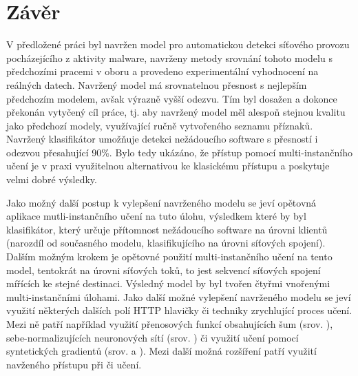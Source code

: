 \chapter*{Závěr}

V předložené práci byl navržen model pro automatickou detekci síťového provozu pocházejícího z aktivity malware, navrženy metody srovnání tohoto modelu s předchozími pracemi v oboru a provedeno experimentální vyhodnocení na reálných datech. Navržený model má srovnatelnou přesnost s nejlepším předchozím modelem, avšak výrazně vyšší odezvu. Tím byl dosažen a dokonce překonán vytyčený cíl práce, tj. aby navržený model měl alespoň stejnou kvalitu jako předchozí modely, využívající ručně vytvořeného seznamu příznaků. Navržený klasifikátor umožňuje detekci nežádoucího software s přesností i odezvou přesahující 90\%. Bylo tedy ukázáno, že přístup pomocí multi-instančního učení je v praxi využitelnou alternativou ke klasickému přístupu a poskytuje velmi dobré výsledky.

Jako možný další postup k vylepšení navrženého modelu se jeví opětovná aplikace mutli-instančního učení na tuto úlohu, výsledkem které by byl klasifikátor, který určuje přítomnost nežádoucího software na úrovni klientů (narozdíl od současného modelu, klasifikujícího na úrovni síťových spojení). Dalším možným krokem je opětovné použití multi-instančního učení na tento model, tentokrát na úrovni síťových toků, to jest sekvencí síťových spojení mířících ke stejné destinaci. Výsledný model by byl tvořen čtyřmi vnořenými multi-instančními úlohami. Jako další možné vylepšení navrženého modelu se jeví využití některých dalších polí HTTP hlavičky či techniky zrychlující proces učení. Mezi ně patří například využití přenosových funkcí obsahujících šum (srov. \cite{gulcehre_noisy_2016}), sebe-normalizujících neuronových sítí (srov. \cite{klambauer_self-normalizing_2017}) či využití učení pomocí syntetických gradientů (srov. \cite{jaderberg_decoupled_2016} a \cite{czarnecki_understanding_2017}). Mezi další možná rozšíření patří využití navženého přístupu při  či  učení.

